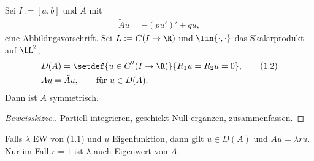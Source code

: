 \begin{prop}
\label{prop:1.34}
Sei $I:=[a,b]$ und $\tilde{A}$ mit
\begin{align*}
\tilde{A}u = -(pu')' + qu,
\end{align*}
eine Abbildngsvorschrift. Sei $L:=C(I\to\R)$ und $\lin{\cdot,\cdot}$ das
Skalarprodukt auf $\LL^2$,
\begin{align*}
&D(A) = \setdef{u\in C^2(I\to\R)}{R_1u=R_2u=0},\tag{1.2}\\
&Au = \tilde{A}u,\qquad \text{für }u\in D(A).
\end{align*}
Dann ist $A$ symmetrisch.\fishhere
\end{prop}
\begin{proof}[Beweisskizze.]
Partiell integrieren, geschickt Null ergänzen, zusammenfassen.\qedhere
\end{proof}

\begin{bem}[Achtung:]
\label{bem:1.35}
Falls $\lambda$ EW von (1.1) und $u$ Eigenfunktion, dann gilt $u\in D(A)$ und
$Au = \lambda r u$. Nur im Fall $r=1$ ist $\lambda$ auch Eigenwert von $A$.
\end{bem}

